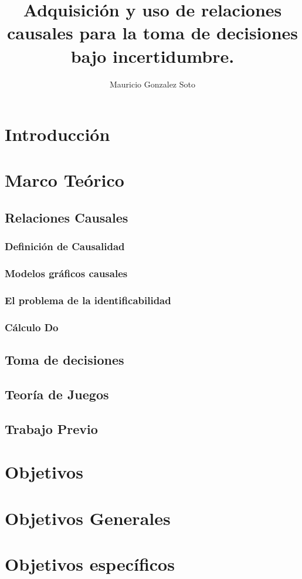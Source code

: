 \documentclass[11pt]{article}
\title{Adquisición y uso de relaciones causales para la toma de decisiones bajo incertidumbre.}
\author{Mauricio Gonzalez Soto}
\theoremstyle{plain}
\begin{document}
\maketitle
\section{Introducción}

\section{Marco Teórico}
	\subsection{Relaciones Causales}
		\subsubsection{Definición de Causalidad}
		\subsubsection{Modelos gráficos causales}
		\subsubsection{El problema de la identificabilidad}
		\subsubsection{Cálculo Do}
	\subsection{Toma de decisiones}
	\subsection{Teoría de Juegos}
	\subsection{Trabajo Previo}

\section{Objetivos}
	\section{Objetivos Generales}
	\section{Objetivos específicos}
	
\end{document}
